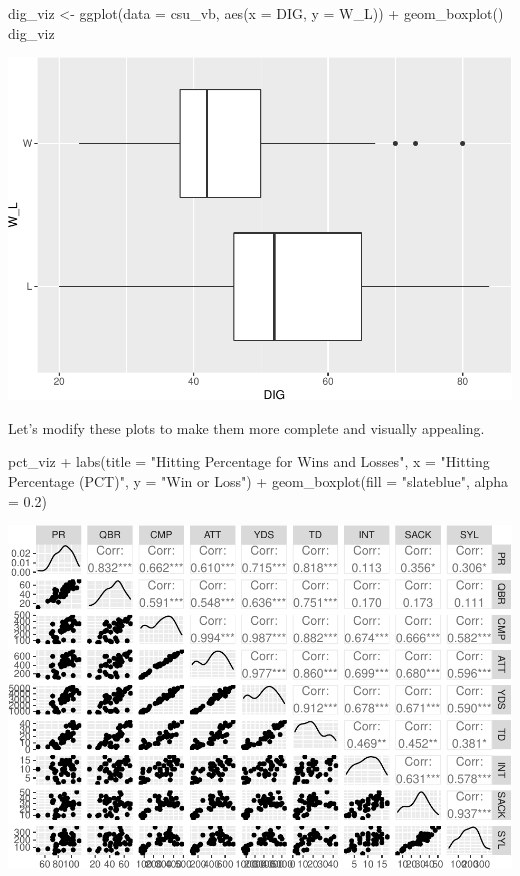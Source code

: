 \documentclass[
  11pt,
]{book}
\newenvironment{Shaded}{\begin{snugshade}}{\end{snugshade}}
\newcommand{\AttributeTok}[1]{\textcolor[rgb]{0.77,0.63,0.00}{#1}}
\newcommand{\FloatTok}[1]{\textcolor[rgb]{0.00,0.00,0.81}{#1}}
\newcommand{\FunctionTok}[1]{\textcolor[rgb]{0.00,0.00,0.00}{#1}}
\newcommand{\NormalTok}[1]{#1}
\newcommand{\OtherTok}[1]{\textcolor[rgb]{0.56,0.35,0.01}{#1}}
\newcommand{\SpecialCharTok}[1]{\textcolor[rgb]{0.00,0.00,0.00}{#1}}
\newcommand{\StringTok}[1]{\textcolor[rgb]{0.31,0.60,0.02}{#1}}
\theoremstyle{definition}
\theoremstyle{definition}
\theoremstyle{definition}
\theoremstyle{definition}
\theoremstyle{remark}
\begin{document}
\begin{Shaded}
\begin{Highlighting}[]
\NormalTok{dig\_viz }\OtherTok{\textless{}{-}} \FunctionTok{ggplot}\NormalTok{(}\AttributeTok{data =}\NormalTok{ csu\_vb, }\FunctionTok{aes}\NormalTok{(}\AttributeTok{x =}\NormalTok{ DIG, }\AttributeTok{y =}\NormalTok{ W\_L)) }\SpecialCharTok{+} \FunctionTok{geom\_boxplot}\NormalTok{()}
\NormalTok{dig\_viz}
\end{Highlighting}
\end{Shaded}

\includegraphics{series_files/figure-latex/unnamed-chunk-21-2.pdf}

Let's modify these plots to make them more complete and visually appealing.

\begin{Shaded}
\begin{Highlighting}[]
\NormalTok{pct\_viz }\SpecialCharTok{+} \FunctionTok{labs}\NormalTok{(}\AttributeTok{title =} \StringTok{"Hitting Percentage for Wins and Losses"}\NormalTok{, }\AttributeTok{x =} \StringTok{"Hitting Percentage (PCT)"}\NormalTok{,}
    \AttributeTok{y =} \StringTok{"Win or Loss"}\NormalTok{) }\SpecialCharTok{+} \FunctionTok{geom\_boxplot}\NormalTok{(}\AttributeTok{fill =} \StringTok{"slateblue"}\NormalTok{, }\AttributeTok{alpha =} \FloatTok{0.2}\NormalTok{)}
\end{Highlighting}
\end{Shaded}

\includegraphics{series_files/figure-latex/unnamed-chunk-22-1.pdf}
\end{document}
